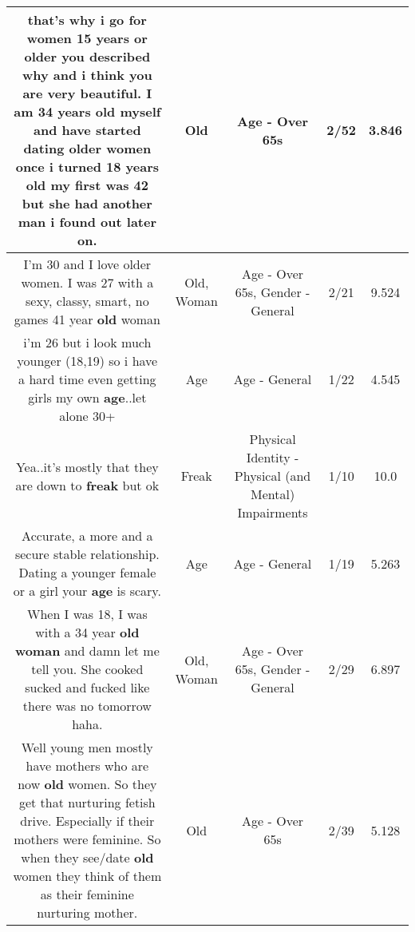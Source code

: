 \documentclass[11pt]{article}
\newlength\mylength
\begin{document}
\begin{center}
\begin{longtable}{|C{.65\mylength}|C{.30\mylength}|C{.12\mylength}|C{.12\mylength}|C{.12\mylength}|}
  \small that's why i go for women 15 years or older you described why and i think you are very beautiful. I am 34 years \textbf{old} myself and have started dating older women once i turned 18 years \textbf{old} my first was 42 but she had another man i found out later on.\normalsize   & Old & Age - Over 65s & 2/52 & 3.846 \\  \hline
  \small I'm 30 and I love older women. I was 27 with a sexy, classy, smart, no games 41 year \textbf{old} woman\normalsize   & Old, Woman & Age - Over 65s, Gender - General & 2/21 & 9.524 \\  \hline
  \small i'm 26 but i look much younger (18,19) so i have a hard time even getting girls my own \textbf{age}..let alone 30+\normalsize   & Age & Age - General & 1/22 & 4.545 \\  \hline
  \small Yea..it's mostly that they are down to \textbf{freak} but ok\normalsize   & Freak & Physical Identity - Physical (and Mental) Impairments & 1/10 & 10.0 \\  \hline
  \small Accurate, a more and a secure stable relationship. Dating a younger female or a girl your \textbf{age} is scary.\normalsize   & Age & Age - General & 1/19 & 5.263 \\  \hline
  \small When I was 18, I was with a 34 year \textbf{old} \textbf{woman} and damn let me tell you. She cooked sucked and fucked like there was no tomorrow haha.\normalsize   & Old, Woman & Age - Over 65s, Gender - General & 2/29 & 6.897 \\  \hline
  \small Well young men mostly have mothers who are now \textbf{old} women.  So they get that nurturing fetish drive.   Especially if their mothers were feminine. So when they see/date \textbf{old} women they think of them as their feminine nurturing mother.\normalsize   & Old & Age - Over 65s & 2/39 & 5.128 \\  \hline

\end{longtable}
\end{center}
\end{document}
